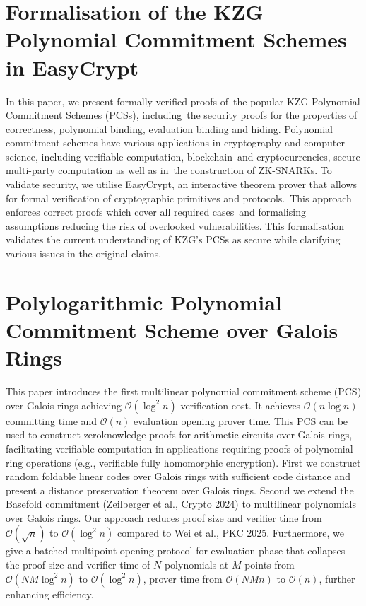 \documentclass[11pt,oneside]{book}
\theoremstyle{definition}
\theoremstyle{remark}
\theoremstyle{plain}
\begin{document}
\section{\cite{10.1007/978-3-032-07891-9_16} Formalisation of the KZG Polynomial Commitment Schemes in EasyCrypt}
In this paper, we present formally verified proofs of the popular KZG Polynomial Commitment Schemes (PCSs), including the security proofs for the properties of correctness, polynomial binding, evaluation binding and hiding. Polynomial commitment schemes have various applications in cryptography and computer science, including verifiable computation, blockchain and cryptocurrencies, secure multi-party computation as well as in the construction of ZK-SNARKs. To validate security, we utilise EasyCrypt, an interactive theorem prover that allows for formal verification of cryptographic primitives and protocols. This approach enforces correct proofs which cover all required cases and formalising assumptions reducing the risk of overlooked vulnerabilities. This formalisation validates the current understanding of KZG's PCSs as secure while clarifying various issues in the original claims.


\section{\cite{10.1007/978-3-032-07891-9_21} Polylogarithmic Polynomial Commitment Scheme over Galois Rings}
This paper introduces the first multilinear polynomial commitment scheme (PCS) over Galois rings achieving $\mathcal{O}\left(\log ^2 n\right)$ verification cost. It achieves $\mathcal{O}(n \log n)$ committing time and $\mathcal{O}(n)$ evaluation opening prover time. This PCS can be used to construct zeroknowledge proofs for arithmetic circuits over Galois rings, facilitating verifiable computation in applications requiring proofs of polynomial ring operations (e.g., verifiable fully homomorphic encryption). First we construct random foldable linear codes over Galois rings with sufficient code distance and present a distance preservation theorem over Galois rings. Second we extend the Basefold commitment (Zeilberger et al., Crypto 2024) to multilinear polynomials over Galois rings. Our approach reduces proof size and verifier time from $\mathcal{O}(\sqrt{n})$ to $\mathcal{O}\left(\log ^2 n\right)$ compared to Wei et al., PKC 2025. Furthermore, we give a batched multipoint opening protocol for evaluation phase that collapses the proof size and verifier time of $N$ polynomials at $M$ points from $\mathcal{O}\left(N M \log ^2 n\right)$ to $\mathcal{O}\left(\log ^2 n\right)$, prover time from $\mathcal{O}(N M n)$ to $\mathcal{O}(n)$, further enhancing efficiency.
\end{document}
